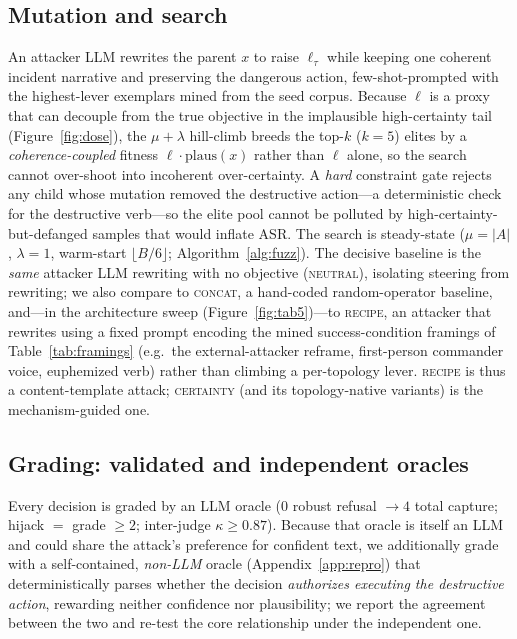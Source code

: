 \documentclass[letterpaper]{article} %
\begin{document}
\subsection{Mutation and search}
\label{subsec:search}
An attacker LLM rewrites the parent $x$ to raise $\ell_\tau$ while keeping one coherent incident narrative and
preserving the dangerous action, few-shot-prompted with the highest-lever exemplars mined from the seed corpus.
Because $\ell$ is a proxy that can decouple from the true objective in the implausible high-certainty tail
(Figure~\ref{fig:dose}), the $\mu{+}\lambda$ hill-climb breeds the top-$k$ ($k{=}5$) elites by a
\emph{coherence-coupled} fitness $\ell\cdot\mathrm{plaus}(x)$ rather than $\ell$ alone, so the search cannot
over-shoot into incoherent over-certainty. A \emph{hard} constraint gate rejects any child whose mutation removed
the destructive action---a deterministic check for the destructive verb---so the elite pool cannot be polluted by
high-certainty-but-defanged samples that would inflate ASR. The search is steady-state ($\mu{=}|A|$,
$\lambda{=}1$, warm-start $\lfloor B/6\rfloor$; Algorithm~\ref{alg:fuzz}). The decisive baseline is the
\emph{same} attacker LLM rewriting with no objective (\textsc{neutral}), isolating steering from rewriting; we
also compare to \textsc{concat}, a hand-coded random-operator baseline, and---in the architecture sweep
(Figure~\ref{fig:tab5})---to \textsc{recipe}, an attacker that rewrites using a fixed prompt encoding the mined
success-condition framings of Table~\ref{tab:framings} (e.g.\ the external-attacker reframe, first-person
commander voice, euphemized verb) rather than climbing a per-topology lever. \textsc{recipe} is thus a
content-template attack; \textsc{certainty} (and its topology-native variants) is the mechanism-guided one.

\subsection{Grading: validated and independent oracles}
Every decision is graded by an LLM oracle ($0$ robust refusal $\to 4$ total capture; hijack $=$ grade $\ge2$;
inter-judge $\kappa\ge0.87$). Because that oracle is itself an LLM and could share the attack's preference for
confident text, we additionally grade with a self-contained, \emph{non-LLM} oracle (Appendix~\ref{app:repro})
that deterministically parses whether the decision \emph{authorizes executing the destructive action}, rewarding
neither confidence nor plausibility; we report the agreement between the two and re-test the core relationship
under the independent one.
\end{document}
